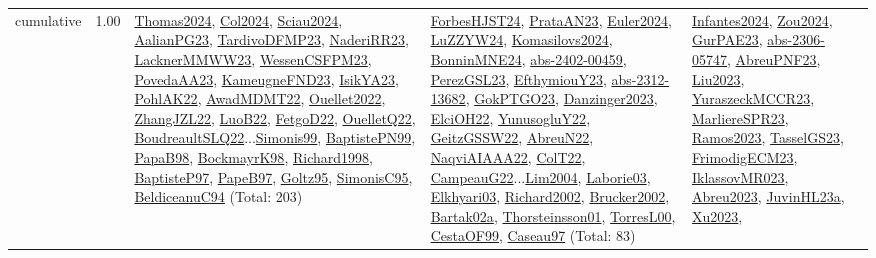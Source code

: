 {\begin{longtable}{p{3cm}r>{\raggedright\arraybackslash}p{6cm}>{\raggedright\arraybackslash}p{6cm}>{\raggedright\arraybackslash}p{8cm}}
\index{cumulative}\index{Constraints!cumulative}cumulative &  1.00 & \hyperref[detail:Thomas2024]{Thomas2024}, \hyperref[detail:Col2024]{Col2024}, \hyperref[detail:Sciau2024]{Sciau2024}, \hyperref[detail:AalianPG23]{AalianPG23}, \hyperref[detail:TardivoDFMP23]{TardivoDFMP23}, \hyperref[detail:NaderiRR23]{NaderiRR23}, \hyperref[detail:LacknerMMWW23]{LacknerMMWW23}, \hyperref[detail:WessenCSFPM23]{WessenCSFPM23}, \hyperref[detail:PovedaAA23]{PovedaAA23}, \hyperref[detail:KameugneFND23]{KameugneFND23}, \hyperref[detail:IsikYA23]{IsikYA23}, \hyperref[detail:PohlAK22]{PohlAK22}, \hyperref[detail:AwadMDMT22]{AwadMDMT22}, \hyperref[detail:Ouellet2022]{Ouellet2022}, \hyperref[detail:ZhangJZL22]{ZhangJZL22}, \hyperref[detail:LuoB22]{LuoB22}, \hyperref[detail:FetgoD22]{FetgoD22}, \hyperref[detail:OuelletQ22]{OuelletQ22}, \hyperref[detail:BoudreaultSLQ22]{BoudreaultSLQ22}...\hyperref[detail:Simonis99]{Simonis99}, \hyperref[detail:BaptistePN99]{BaptistePN99}, \hyperref[detail:PapaB98]{PapaB98}, \hyperref[detail:BockmayrK98]{BockmayrK98}, \hyperref[detail:Richard1998]{Richard1998}, \hyperref[detail:BaptisteP97]{BaptisteP97}, \hyperref[detail:PapeB97]{PapeB97}, \hyperref[detail:Goltz95]{Goltz95}, \hyperref[detail:SimonisC95]{SimonisC95}, \hyperref[detail:BeldiceanuC94]{BeldiceanuC94} (Total: 203) & \hyperref[detail:ForbesHJST24]{ForbesHJST24}, \hyperref[detail:PrataAN23]{PrataAN23}, \hyperref[detail:Euler2024]{Euler2024}, \hyperref[detail:LuZZYW24]{LuZZYW24}, \hyperref[detail:Komasilovs2024]{Komasilovs2024}, \hyperref[detail:BonninMNE24]{BonninMNE24}, \hyperref[detail:abs-2402-00459]{abs-2402-00459}, \hyperref[detail:PerezGSL23]{PerezGSL23}, \hyperref[detail:EfthymiouY23]{EfthymiouY23}, \hyperref[detail:abs-2312-13682]{abs-2312-13682}, \hyperref[detail:GokPTGO23]{GokPTGO23}, \hyperref[detail:Danzinger2023]{Danzinger2023}, \hyperref[detail:ElciOH22]{ElciOH22}, \hyperref[detail:YunusogluY22]{YunusogluY22}, \hyperref[detail:GeitzGSSW22]{GeitzGSSW22}, \hyperref[detail:AbreuN22]{AbreuN22}, \hyperref[detail:NaqviAIAAA22]{NaqviAIAAA22}, \hyperref[detail:ColT22]{ColT22}, \hyperref[detail:CampeauG22]{CampeauG22}...\hyperref[detail:Lim2004]{Lim2004}, \hyperref[detail:Laborie03]{Laborie03}, \hyperref[detail:Elkhyari03]{Elkhyari03}, \hyperref[detail:Richard2002]{Richard2002}, \hyperref[detail:Brucker2002]{Brucker2002}, \hyperref[detail:Bartak02a]{Bartak02a}, \hyperref[detail:Thorsteinsson01]{Thorsteinsson01}, \hyperref[detail:TorresL00]{TorresL00}, \hyperref[detail:CestaOF99]{CestaOF99}, \hyperref[detail:Caseau97]{Caseau97} (Total: 83) & \hyperref[detail:Infantes2024]{Infantes2024}, \hyperref[detail:Zou2024]{Zou2024}, \hyperref[detail:GurPAE23]{GurPAE23}, \hyperref[detail:abs-2306-05747]{abs-2306-05747}, \hyperref[detail:AbreuPNF23]{AbreuPNF23}, \hyperref[detail:Liu2023]{Liu2023}, \hyperref[detail:YuraszeckMCCR23]{YuraszeckMCCR23}, \hyperref[detail:MarliereSPR23]{MarliereSPR23}, \hyperref[detail:Ramos2023]{Ramos2023}, \hyperref[detail:TasselGS23]{TasselGS23}, \hyperref[detail:FrimodigECM23]{FrimodigECM23}, \hyperref[detail:IklassovMR023]{IklassovMR023}, \hyperref[detail:Abreu2023]{Abreu2023}, \hyperref[detail:JuvinHL23a]{JuvinHL23a}, \hyperref[detail:Xu2023]{Xu2023}, 
\end{longtable}}

